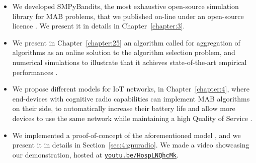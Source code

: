 \begin{itemize}


    \item
    We developed SMPyBandits, the most exhaustive open-source simulation library for MAB problems, that we published on-line under an open-source licence \cite{SMPyBandits,SMPyBanditsJMLR}.
    We present it in details in Chapter~\ref{chapter:3}.

    \item
    We present in Chapter~\ref{chapter:25} an algorithm called \Aggr{} for aggregation of algorithms as an online solution to the algorithm selection problem, and numerical simulations to illustrate that it achieves state-of-the-art empirical performances
    \cite{Besson2018WCNC}.

    \item
    We propose different models for IoT networks, in Chapter~\ref{chapter:4}, where end-devices with cognitive radio capabilities can implement MAB algorithms on their side, to automatically increase their battery life and allow more devices to use the same network while maintaining a high Quality of Service
    \cite{Bonnefoi17,Besson2019WCNC,Bonnefoi2019WCNC,MoyBesson2019}.

    \item
    We implemented a proof-of-concept of the aforementioned model \cite{Besson2018ICT}, and we present it in details in Section~\ref{sec:4:gnuradio}. We made a video showcasing our demonstration, hosted at \texttt{\href{https://youtu.be/HospLNQhcMk}{youtu.be/HospLNQhcMk}}.



\end{itemize}
